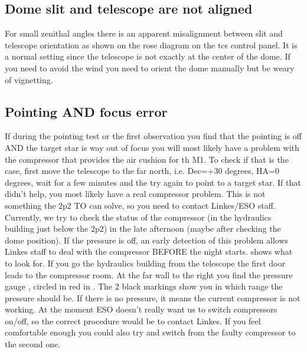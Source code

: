 \documentclass[11pt,fleqn,a4paper]{book}
\begin{document}
\subsection{Dome slit and telescope are not aligned}
For small zenithal angles there is an apparent misalignment between \gls{slit} and telescope orientation as shown on the \gls{rose diagram} on the \gls{tcs} control panel. It is a normal setting since the telescope is not exactly at the center of the \gls{dome}.  If you need to avoid the wind you need to orient the \gls{dome} manually but be weary of vignetting.


\subsection{Pointing AND focus error}

If during the pointing test or the first observation  you find that the pointing is off AND the target star is way out of focus you will most likely have a problem with the compressor that provides the air cushion for th M1.  To check if that is the case, first move the telescope to the far north, i.e. Dec=+30 degrees, HA=0 degrees, wait for a few minutes and the try again to point to a target star. If that didn't help, you most likely have a real compressor problem. This is not something the 2p2 TO can solve, so you need to contact Linkes/ESO staff.  Currently, we try to check the status of the compressor (in the hydraulics building just below the 2p2) in the late afternoon (maybe after checking the dome position). If the pressure is off,  an early detection of this problem allows Linkes staff to deal with the compressor BEFORE the night starts.  shows what to look for. If you go
 the hydraulics building from the telescope the first door leads to the compressor room. At the far wall to the right you find the pressure gauge , circled in red in . The 2 black markings show you in which range the pressure should be. If there is no pressure, it means  the current compressor is not working. At the moment ESO doesn't really want us to switch compressors on/off, so the correct procedure would be to contact Linkes.  If you feel comfortable enough you could also try and switch from the faulty compressor to the second one. 
 
 \newpage
 
\end{document}
